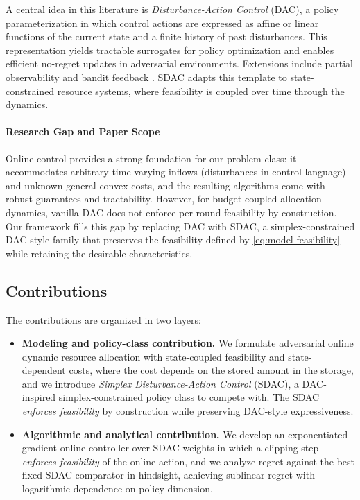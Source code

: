 \documentclass[11pt]{article}
\begin{document}
A central idea in this literature is \emph{Disturbance-Action Control} (DAC), a policy parameterization in which control actions are expressed as affine or linear functions of the current state and a finite history of past disturbances. This representation yields tractable surrogates for policy optimization and enables efficient no-regret updates in adversarial environments. Extensions include partial observability \cite{lale2020logarithmic} and bandit feedback \cite{hazan2020nonstochasticBandit}. SDAC adapts this template to state-constrained resource systems, where feasibility is coupled over time through the dynamics.



\paragraph{Research Gap and Paper Scope} Online control provides a strong foundation for our problem class: it accommodates arbitrary time-varying inflows (disturbances in control language) and unknown general convex costs, and the resulting algorithms come with robust guarantees and tractability. However, for budget-coupled allocation dynamics, vanilla DAC does not enforce per-round feasibility by construction. Our framework fills this gap by replacing DAC with SDAC, a simplex-constrained DAC-style family that preserves the feasibility defined by \eqref{eq:model-feasibility} while retaining the desirable characteristics.




\subsection{Contributions}
The contributions are organized in two layers:
\begin{itemize}
    \item \textbf{Modeling and policy-class contribution.} We formulate adversarial online dynamic resource allocation with state-coupled feasibility and state-dependent costs, where the cost depends on the stored amount in the storage, and we introduce \emph{Simplex Disturbance-Action Control} (SDAC), a DAC-inspired simplex-constrained policy class to compete with. The SDAC \emph{enforces feasibility} by construction while preserving DAC-style expressiveness.
    \item \textbf{Algorithmic and analytical contribution.} We develop an exponentiated-gradient online controller over SDAC weights in which a clipping step \emph{enforces feasibility} of the online action, and we analyze regret against the best fixed SDAC comparator in hindsight, achieving sublinear regret with logarithmic dependence on policy dimension.
\end{itemize}
\end{document}
